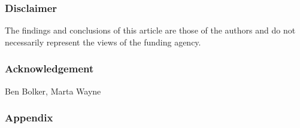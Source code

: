 \documentclass[12pt,]{article}
\begin{document}
\subsubsection{Disclaimer}\label{disclaimer}

The findings and conclusions of this article are those of the authors
and do not necessarily represent the views of the funding agency.

\subsubsection{Acknowledgement}\label{Acknowledgement}
Ben Bolker,  Marta Wayne

\subsubsection{Appendix}\label{appendix-1}


\end{document}
